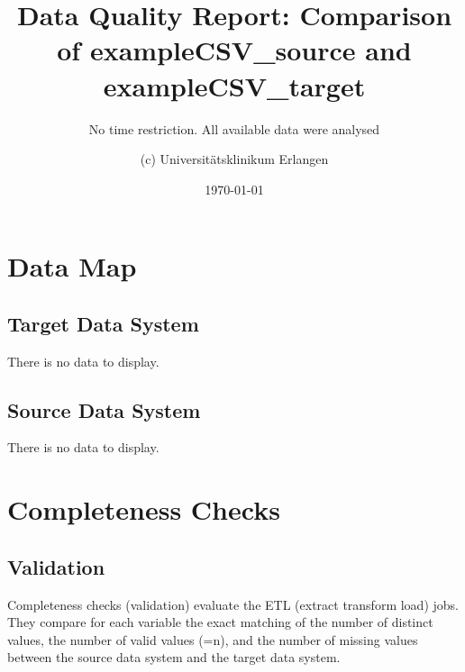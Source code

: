 \documentclass[
]{article}
\title{Data Quality Report: Comparison of exampleCSV\_source and
exampleCSV\_target}
\subtitle{No time restriction. All available data were analysed}
\author{(c) Universitätsklinikum Erlangen}
\date{\today}
\begin{document}
\maketitle

{
\setcounter{tocdepth}{2}
\tableofcontents
}
\newpage

\hypertarget{data-map}{%
\section{Data Map}\label{data-map}}

\hypertarget{target-data-system}{%
\subsection{Target Data System}\label{target-data-system}}

There is no data to display.

\hypertarget{source-data-system}{%
\subsection{Source Data System}\label{source-data-system}}

There is no data to display.

\newpage

\hypertarget{completeness-checks}{%
\section{Completeness Checks}\label{completeness-checks}}

\hypertarget{validation}{%
\subsection{Validation}\label{validation}}

Completeness checks (validation) evaluate the ETL (extract transform
load) jobs. They compare for each variable the exact matching of the
number of distinct values, the number of valid values (=n), and the
number of missing values between the source data system and the target
data system.
\end{document}
